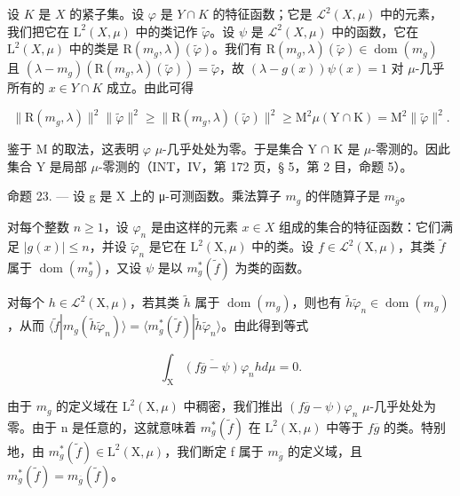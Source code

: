 设 \(K\) 是 \(X\) 的紧子集。设 \(\varphi\) 是 \(Y \cap K\) 的特征函数；它是 \(\mathcal{L}^{2}(X,\mu)\) 中的元素，我们把它在 \(\mathrm{L}^{2}(X,\mu)\) 中的类记作 \(\widetilde{\varphi}\)。设 \(\psi\) 是 \(\mathcal{L}^{2}(X,\mu)\) 中的函数，它在 \(\mathrm{L}^{2}(X,\mu)\) 中的类是 \(\mathrm{R}(m_g,\lambda)(\widetilde{\varphi})\)。我们有 \(\mathrm{R}(m_g,\lambda)(\widetilde{\varphi}) \in \operatorname{dom}(m_g)\) 且 \((\lambda - m_g)(\mathrm{R}(m_g,\lambda)(\widetilde{\varphi})) = \widetilde{\varphi}\)，故 \((\lambda - g(x))\psi(x) = 1\) 对 \(\mu\)-几乎所有的 \(x \in Y \cap K\) 成立。由此可得

\[
\| \mathrm{R} (m _ {g}, \lambda) \| ^ {2} \| \widetilde {\varphi} \| ^ {2} \geqslant \| \mathrm{R} (m _ {g}, \lambda) (\widetilde {\varphi}) \| ^ {2} \geqslant \mathrm{M} ^ {2} \mu (\mathrm{Y} \cap \mathrm{K}) = \mathrm{M} ^ {2} \| \widetilde {\varphi} \| ^ {2}.
\]

鉴于 M 的取法，这表明 \(\varphi\) \(\mu\)-几乎处处为零。于是集合 Y \(\cap\) K 是 \(\mu\)-零测的。因此集合 Y 是局部 \(\mu\)-零测的（INT，IV，第 172 页，§ 5，第 2 目，命题 5）。

命题 23. --- 设 g 是 X 上的 μ-可测函数。乘法算子 \(m_{g}\) 的伴随算子是 \(m_{\overline{g}}\)。

对每个整数 \(n \geqslant 1\)，设 \(\varphi_{n}\) 是由这样的元素 \(x \in X\) 组成的集合的特征函数：它们满足 \(|g(x)| \leqslant n\)，并设 \(\widetilde{\varphi}_{n}\) 是它在 \(\mathrm{L}^{2}(\mathrm{X}, \mu)\) 中的类。设 \(f \in \mathcal{L}^{2}(\mathrm{X}, \mu)\)，其类 \(\widetilde{f}\) 属于 \(\operatorname{dom}(m_{g}^{*})\)，又设 \(\psi\) 是以 \(m_{g}^{*}(\widetilde{f})\) 为类的函数。

对每个 \(h \in \mathcal{L}^2(\mathrm{X}, \mu)\)，若其类 \(\widetilde{h}\) 属于 \(\operatorname{dom}(m_g)\)，则也有 \(\widetilde{h}\widetilde{\varphi}_n \in \operatorname{dom}(m_g)\)，从而 \(\langle \widetilde{f} | m_g(\widetilde{h}\widetilde{\varphi}_n) \rangle = \langle m_g^*(\widetilde{f}) | \widetilde{h}\widetilde{\varphi}_n \rangle\)。由此得到等式

\[
\int_ {\mathrm{X}} \overline {{(f \overline {{g}} - \psi)}} \varphi_ {n} h d \mu = 0.
\]

由于 \(m_{g}\) 的定义域在 \(\mathrm{L}^{2}(\mathrm{X},\mu)\) 中稠密，我们推出 \((f\overline{g}-\psi)\varphi_{n}\) \(\mu\)-几乎处处为零。由于 n 是任意的，这就意味着 \(m_{g}^{*}(\widetilde{f})\) 在 \(\mathrm{L}^{2}(\mathrm{X},\mu)\) 中等于 \(f\overline{g}\) 的类。特别地，由 \(m_{g}^{*}(\widetilde{f}) \in \mathrm{L}^{2}(\mathrm{X},\mu)\)，我们断定 f 属于 \(m_{\overline{g}}\) 的定义域，且 \(m_{g}^{*}(\widetilde{f}) = m_{\overline{g}}(\widetilde{f})\)。

